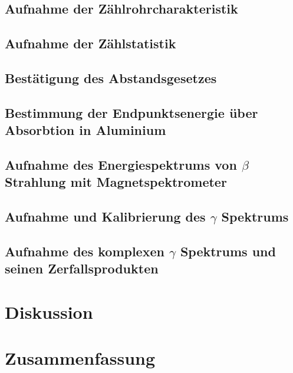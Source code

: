 \documentclass[12pt,english,ngerman]{scrartcl}
\begin{document}
\subsection{Aufnahme der Zählrohrcharakteristik}




\subsection{Aufnahme der Zählstatistik}


\subsection{Bestätigung des Abstandsgesetzes}


\subsection{Bestimmung der Endpunktsenergie über Absorbtion in Aluminium}


\subsection{Aufnahme des Energiespektrums von \texorpdfstring{$\beta$}{beta} Strahlung mit Magnetspektrometer}


\subsection{Aufnahme und Kalibrierung des \texorpdfstring{$\gamma$}{gamma} Spektrums}


\subsection{Aufnahme des komplexen \texorpdfstring{$\gamma$}{gamma} Spektrums und seinen Zerfallsprodukten}






\section*{Diskussion}\label{sec:diskussion}



\section{Zusammenfassung}



\newpage

\printbibliography
\listoffigures
\listoftables
\end{document}
